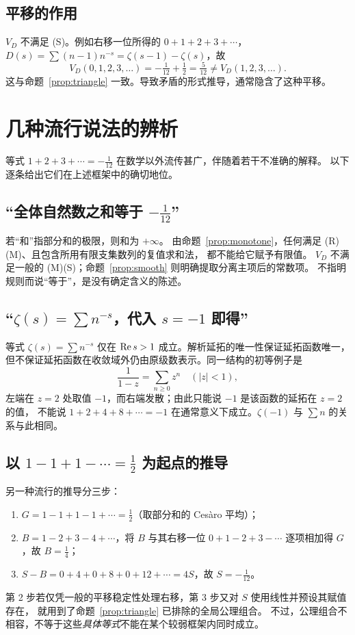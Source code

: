 \documentclass[11pt]{article}
\begin{document}
\subsection{平移的作用}
$V_D$ 不满足 (S)。例如右移一位所得的 $0+1+2+3+\cdots$，
$D(s)=\sum(n-1)n^{-s}=\zeta(s-1)-\zeta(s)$，故
\[
 V_D(0,1,2,3,\ldots)=-\tfrac1{12}+\tfrac12=\tfrac5{12}\ne V_D(1,2,3,\ldots).
\]
这与命题~\ref{prop:triangle} 一致。导致矛盾的形式推导，通常隐含了这种平移。

\section{几种流行说法的辨析}
等式 $1+2+3+\cdots=-\tfrac1{12}$ 在数学以外流传甚广，伴随着若干不准确的解释。
以下逐条给出它们在上述框架中的确切地位。

\subsection{\texorpdfstring{“全体自然数之和等于 $-\tfrac1{12}$”}{“全体自然数之和等于 −1/12”}}
若“和”指部分和的极限，则和为 $+\infty$。
由命题~\ref{prop:monotone}，任何满足 (R)(M)、且包含所用有限支集数列的复值求和法，
都不能给它赋予有限值。
$V_D$ 不满足一般的 (M)(S)；命题~\ref{prop:smooth} 则明确提取分离主项后的常数项。
不指明规则而说“等于”，是没有确定含义的陈述。

\subsection{\texorpdfstring{“$\zeta(s)=\sum n^{-s}$，代入 $s=-1$ 即得”}{“ζ(s)=Σn⁻ˢ，代入 s=−1 即得”}}
等式 $\zeta(s)=\sum n^{-s}$ 仅在 $\operatorname{Re} s>1$ 成立。解析延拓的唯一性保证延拓函数唯一，
但不保证延拓函数在收敛域外仍由原级数表示。同一结构的初等例子是
\[
 \frac1{1-z}=\sum_{n\ge0}z^n\quad(|z|<1),
\]
左端在 $z=2$ 处取值 $-1$，而右端发散；由此只能说 $-1$ 是该函数的延拓在 $z=2$ 的值，
不能说 $1+2+4+8+\cdots=-1$ 在通常意义下成立。$\zeta(-1)$ 与 $\sum n$ 的关系与此相同。

\subsection{\texorpdfstring{以 $1-1+1-\cdots=\tfrac12$ 为起点的推导}{以 1−1+1−⋯=1/2 为起点的推导}}
另一种流行的推导分三步：
\begin{enumerate}
 \item $G=1-1+1-1+\cdots=\tfrac12$（取部分和的 Cesàro 平均）；
 \item $B=1-2+3-4+\cdots$，将 $B$ 与其右移一位 $0+1-2+3-\cdots$ 逐项相加得 $G$，故 $B=\tfrac14$；
 \item $S-B=0+4+0+8+0+12+\cdots=4S$，故 $S=-\tfrac1{12}$。
\end{enumerate}
第 2 步若仅凭一般的平移稳定性处理右移，第 3 步又对 $S$ 使用线性并预设其赋值存在，
就用到了命题~\ref{prop:triangle} 已排除的全局公理组合。
不过，公理组合不相容，不等于这些\emph{具体等式}不能在某个较弱框架内同时成立。
\end{document}

